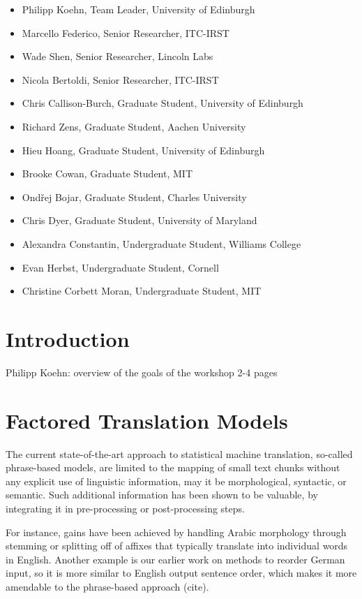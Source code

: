 \documentclass[10pt]{report}
\theoremstyle{plain}
\begin{document}
\begin{itemize}
\item Philipp Koehn, Team Leader, University of Edinburgh
\item Marcello Federico, Senior Researcher, ITC-IRST
\item Wade Shen, Senior Researcher, Lincoln Labs
\item Nicola Bertoldi, Senior Researcher, ITC-IRST
\item Chris Callison-Burch, Graduate Student, University of Edinburgh
\item Richard Zens, Graduate Student, Aachen University
\item Hieu Hoang, Graduate Student, University of Edinburgh
\item Brooke Cowan, Graduate Student, MIT
\item Ond\v{r}ej Bojar, Graduate Student, Charles University
\item Chris Dyer, Graduate Student, University of Maryland
\item Alexandra Constantin, Undergraduate Student, Williams College
\item Evan Herbst, Undergraduate Student, Cornell
\item Christine Corbett Moran, Undergraduate Student, MIT
\end{itemize}

\tableofcontents

\chapter{Introduction}
{\sc Philipp Koehn: overview of the goals of the workshop 2-4 pages}

\chapter{Factored Translation Models}
The current state-of-the-art approach to statistical machine translation, so-called phrase-based models, are limited to the mapping of small text chunks without any explicit use of linguistic information, may it be morphological, syntactic, or semantic. Such additional information has been shown to be valuable, by integrating it in pre-processing or post-processing steps. 

For instance, gains have been achieved by handling Arabic morphology through stemming or splitting off of affixes that typically translate into individual words in English. Another example is our earlier work on methods to reorder German input, so it is more similar to English output sentence order, which makes it more amendable to the phrase-based approach ({\sc cite}).
\end{document}
